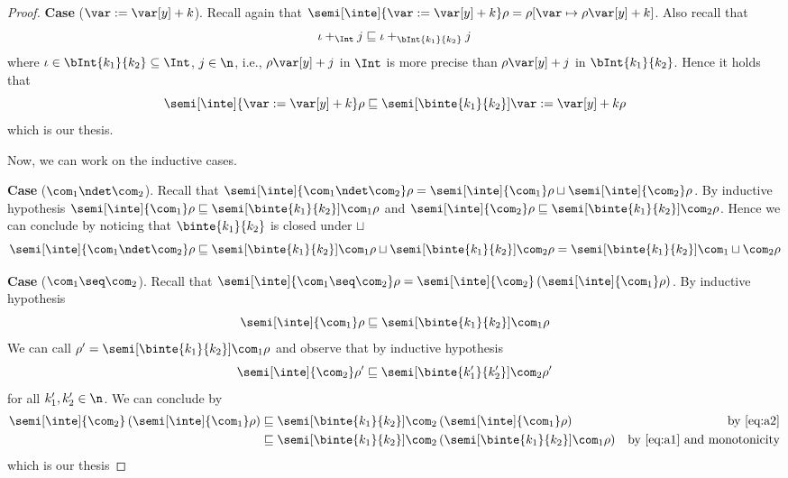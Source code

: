 \begin{proof}
  \medskip

  \noindent
  \textbf{Case} (\(\var := \var[y] + k\)).
  Recall again that
  \({\semi[\inte]{\var := \var[y] + k}\rho} = {\rho[\var \mapsto
    \rho\var[y] + k]}\). Also recall that
  \begin{equation*}
    \iota +_{\Int} j \sqsubseteq \iota +_{\bInt{k_1}{k_2}} j
  \end{equation*}
  where \(\iota \in \bInt{k_1}{k_2} \subseteq \Int\), \(j\in\n\),
  i.e., \(\rho\var[y] + j\) in \(\Int\) is more precise than
  \(\rho\var[y] + j\) in \(\bInt{k_1}{k_2}\). Hence it holds that
  \begin{equation*}
    {\semi[\inte]{\var := \var[y] + k}\rho} \sqsubseteq {\semi[\binte{k_1}{k_2}]{\var := \var[y] + k}\rho}
  \end{equation*}
  which is our thesis.

  \medskip
  \noindent
  Now, we can work on the inductive cases.

  \medskip

  \noindent
  \textbf{Case} (\(\com_1 \ndet \com_2\)).
  Recall that
  \({\semi[\inte]{\com_1 \ndet \com_2}\rho} =
  {\semi[\inte]{\com_1}\rho} \sqcup {\semi[\inte]{\com_2}\rho}\). By
  inductive hypothesis
  \({\semi[\inte]{\com_1}\rho} \sqsubseteq
  {\semi[\binte{k_1}{k_2}]{\com_1}\rho}\) and
  \({\semi[\inte]{\com_2}\rho} \sqsubseteq
  {\semi[\binte{k_1}{k_2}]{\com_2}\rho}\). Hence we can conclude by noticing
  that \(\binte{k_1}{k_2}\) is closed under \(\sqcup\)
  \begin{equation*}
    \semi[\inte]{\com_1 \ndet \com_2}\rho \sqsubseteq
    \semi[\binte{k_1}{k_2}]{\com_1}\rho \sqcup \semi[\binte{k_1}{k_2}]{\com_2}\rho =
    \semi[\binte{k_1}{k_2}]{\com_1 \sqcup \com_2}\rho
  \end{equation*}

  \medskip

  \noindent
  \textbf{Case} (\(\com_1 \seq \com_2\)).
  Recall that
  \({\semi[\inte]{\com_1 \seq \com_2}\rho} =
  {\semi[\inte]{\com_2}\left(\semi[\inte]{\com_1}\rho\right)}\). By
  inductive hypothesis
  \begin{equation}\label{eq:a1}
    {\semi[\inte]{\com_1}\rho} \sqsubseteq {\semi[\binte{k_1}{k_2}]{\com_1}\rho}
  \end{equation}
  We can call \(\rho' = {\semi[\binte{k_1}{k_2}]{\com_1}\rho}\) and observe
  that by inductive hypothesis
  \begin{equation}\label{eq:a2} {\semi[\inte]{\com_2}\rho'}
    \sqsubseteq {\semi[\binte{k_1'}{k_2'}]{\com_2}\rho'}
  \end{equation}
  for all \(k_1',k_2'\in\n\). We can conclude by
  \begin{align*}
    {\semi[\inte]{\com_2}\left(\semi[\inte]{\com_1}\rho\right)} & \sqsubseteq {\semi[\binte{k_1}{k_2}]{\com_2}\left(\semi[\inte]{\com_1}\rho\right)} & \text{by \eqref{eq:a2}}\\
                                                                & \sqsubseteq {\semi[\binte{k_1}{k_2}]{\com_2}\left(\semi[\binte{k_1}{k_2}]{\com_1}\rho\right)} & \text{by \eqref{eq:a1} and monotonicity}
  \end{align*}
  which is our thesis


\end{proof}
